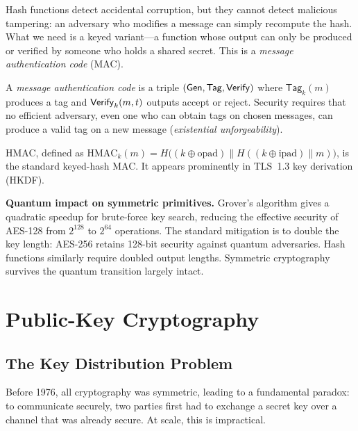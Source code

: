 Hash functions detect accidental corruption, but they cannot detect malicious tampering: an adversary who modifies a message can simply recompute the hash.  What we need is a keyed variant---a function whose output can only be produced or verified by someone who holds a shared secret.  This is a \emph{message authentication code} (MAC).

\begin{definition}[MAC]
\label{def:mac}
A \emph{message authentication code} is a triple $(\mathsf{Gen}, \mathsf{Tag}, \mathsf{Verify})$ where $\mathsf{Tag}_k(m)$ produces a tag and $\mathsf{Verify}_k(m, t)$ outputs accept or reject.  Security requires that no efficient adversary, even one who can obtain tags on chosen messages, can produce a valid tag on a new message (\emph{existential unforgeability}).
\end{definition}

HMAC, defined as $\text{HMAC}_k(m) = H\bigl((k \oplus \text{opad}) \| H((k \oplus \text{ipad}) \| m)\bigr)$, is the standard keyed-hash MAC.  It appears prominently in TLS~1.3 key derivation (HKDF).

\begin{svgraybox}
\textbf{Quantum impact on symmetric primitives.}  Grover's algorithm gives a quadratic speedup for brute-force key search, reducing the effective security of AES-128 from $2^{128}$ to $2^{64}$ operations.  The standard mitigation is to double the key length: AES-256 retains 128-bit security against quantum adversaries.  Hash functions similarly require doubled output lengths.  Symmetric cryptography survives the quantum transition largely intact.
\end{svgraybox}


\section{Public-Key Cryptography}
\label{sec:public-key}

\subsection{The Key Distribution Problem}
\label{subsec:key-distribution}

Before 1976, all cryptography was symmetric, leading to a fundamental paradox: to communicate securely, two parties first had to exchange a secret key over a channel that was already secure.  At scale, this is impractical.

